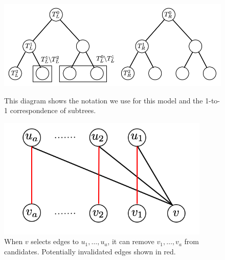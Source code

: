 \begin{figure}[b]
\vspace{-0.2in}
\centering
\begin{minipage}{0.45\textwidth}
\centering
\includegraphics[width=1.1\textwidth]{images/hierarchy_tree.png}
\caption{This diagram shows the notation we use for this model and the 1-to-1 correspondence of subtrees.}\label{fig:hierarchy}
\end{minipage}
\hspace{0cm}
\begin{minipage}{0.45\textwidth}
\centering
\includegraphics[width=0.9\textwidth]{images/greedy.png}


\vspace{-0.3in}
\caption{When $v$ selects edges to $u_1,\ldots, u_a$, it can remove $v_1,\ldots, v_a$ from candidates. Potentially invalidated edges shown in red.}

\label{fig:greedy}
\end{minipage}
\end{figure}




